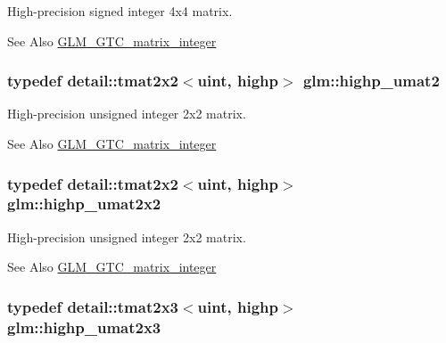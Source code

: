 High-\/precision signed integer 4x4 matrix. \begin{DoxySeeAlso}{See Also}
\hyperlink{group__gtc__matrix__integer}{G\-L\-M\-\_\-\-G\-T\-C\-\_\-matrix\-\_\-integer} 
\end{DoxySeeAlso}
\hypertarget{group__gtc__matrix__integer_ga0c89800e3f63f82da4a4159004811cec}{
\subsubsection[{highp\-\_\-umat2}]{\setlength{\rightskip}{0pt plus 5cm}typedef detail\-::tmat2x2$<$uint, highp$>$ {\bf glm\-::highp\-\_\-umat2}}}\label{group__gtc__matrix__integer_ga0c89800e3f63f82da4a4159004811cec}
High-\/precision unsigned integer 2x2 matrix. \begin{DoxySeeAlso}{See Also}
\hyperlink{group__gtc__matrix__integer}{G\-L\-M\-\_\-\-G\-T\-C\-\_\-matrix\-\_\-integer} 
\end{DoxySeeAlso}
\hypertarget{group__gtc__matrix__integer_ga428410468e33d16dc8aee08b17166669}{
\subsubsection[{highp\-\_\-umat2x2}]{\setlength{\rightskip}{0pt plus 5cm}typedef detail\-::tmat2x2$<$uint, highp$>$ {\bf glm\-::highp\-\_\-umat2x2}}}\label{group__gtc__matrix__integer_ga428410468e33d16dc8aee08b17166669}
High-\/precision unsigned integer 2x2 matrix. \begin{DoxySeeAlso}{See Also}
\hyperlink{group__gtc__matrix__integer}{G\-L\-M\-\_\-\-G\-T\-C\-\_\-matrix\-\_\-integer} 
\end{DoxySeeAlso}
\hypertarget{group__gtc__matrix__integer_ga309076d055b5511a7071ebb5f660ed83}{
\subsubsection[{highp\-\_\-umat2x3}]{\setlength{\rightskip}{0pt plus 5cm}typedef detail\-::tmat2x3$<$uint, highp$>$ {\bf glm\-::highp\-\_\-umat2x3}}}\label{group__gtc__matrix__integer_ga309076d055b5511a7071ebb5f660ed83}
